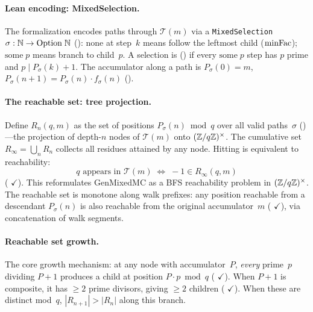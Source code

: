 \paragraph{Lean encoding: MixedSelection.}
The formalization encodes paths through $\mathcal{T}(m)$ via a
\texttt{MixedSelection}
$\sigma : \mathbb{N} \to \mathrm{Option}\;\mathbb{N}$
():
$\mathrm{none}$ at step~$k$ means follow the leftmost child
($\mathrm{minFac}$); $\mathrm{some}\;p$ means branch to child~$p$.
A selection is 
()
if every $\mathrm{some}\;p$ step has $p$ prime and $p \mid P_\sigma(k){+}1$.
The accumulator along a path is
$P_\sigma(0) = m$,
$P_\sigma(n{+}1) = P_\sigma(n) \cdot f_\sigma(n)$
().

\paragraph{The reachable set: tree projection.}
Define $R_n(q, m)$ as the set of positions
$P_\sigma(n) \bmod q$ over all valid paths~$\sigma$
()---the
projection of depth-$n$ nodes of $\mathcal{T}(m)$ onto
$(\mathbb{Z}/q\mathbb{Z})^\times$.  The cumulative set
$R_\infty = \bigcup_n R_n$ collects all residues attained by
any node.  Hitting is equivalent to reachability:
\[
  q \text{ appears in } \mathcal{T}(m)
  \;\Longleftrightarrow\;
  {-}1 \in R_\infty(q, m)
\]
(
{\color{leanink}$\checkmark$}).
This reformulates GenMixedMC as a BFS reachability problem
in $(\mathbb{Z}/q\mathbb{Z})^\times$.
The reachable set is monotone along walk prefixes:
any position reachable from a descendant $P_\sigma(n)$ is also
reachable from the original accumulator~$m$
(
{\color{leanink}$\checkmark$}),
via concatenation of walk segments.

\paragraph{Reachable set growth.}
The core growth mechanism: at any node with accumulator~$P$,
\emph{every} prime~$p$ dividing $P{+}1$ produces a child at position
$P \cdot p \bmod q$
(
{\color{leanink}$\checkmark$}).
When $P{+}1$ is composite, it has $\geq 2$ prime divisors,
giving $\geq 2$ children
(
{\color{leanink}$\checkmark$}).
When these are distinct mod~$q$, $|R_{n+1}| > |R_n|$ along this branch.

